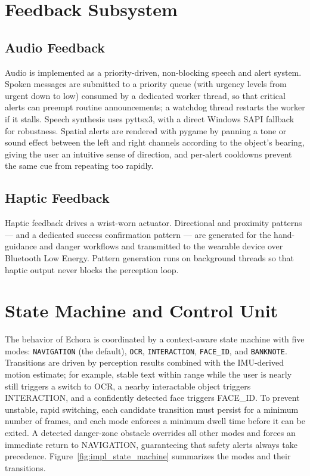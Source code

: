 \section{Feedback Subsystem}

\subsection{Audio Feedback}

Audio is implemented as a priority-driven, non-blocking speech and alert system. Spoken messages are submitted to a priority queue (with urgency levels from urgent down to low) consumed by a dedicated worker thread, so that critical alerts can preempt routine announcements; a watchdog thread restarts the worker if it stalls. Speech synthesis uses pyttsx3, with a direct Windows SAPI fallback for robustness. Spatial alerts are rendered with pygame by panning a tone or sound effect between the left and right channels according to the object's bearing, giving the user an intuitive sense of direction, and per-alert cooldowns prevent the same cue from repeating too rapidly.

\subsection{Haptic Feedback}

Haptic feedback drives a wrist-worn actuator. Directional and proximity patterns --- and a dedicated success confirmation pattern --- are generated for the hand-guidance and danger workflows and transmitted to the wearable device over Bluetooth Low Energy. Pattern generation runs on background threads so that haptic output never blocks the perception loop.

\section{State Machine and Control Unit}

The behavior of Echora is coordinated by a context-aware state machine with five modes: \texttt{NAVIGATION} (the default), \texttt{OCR}, \texttt{INTERACTION}, \texttt{FACE\_ID}, and \texttt{BANKNOTE}. Transitions are driven by perception results combined with the IMU-derived motion estimate; for example, stable text within range while the user is nearly still triggers a switch to OCR, a nearby interactable object triggers INTERACTION, and a confidently detected face triggers FACE\_ID. To prevent unstable, rapid switching, each candidate transition must persist for a minimum number of frames, and each mode enforces a minimum dwell time before it can be exited. A detected danger-zone obstacle overrides all other modes and forces an immediate return to NAVIGATION, guaranteeing that safety alerts always take precedence. Figure~\ref{fig:impl_state_machine} summarizes the modes and their transitions.

